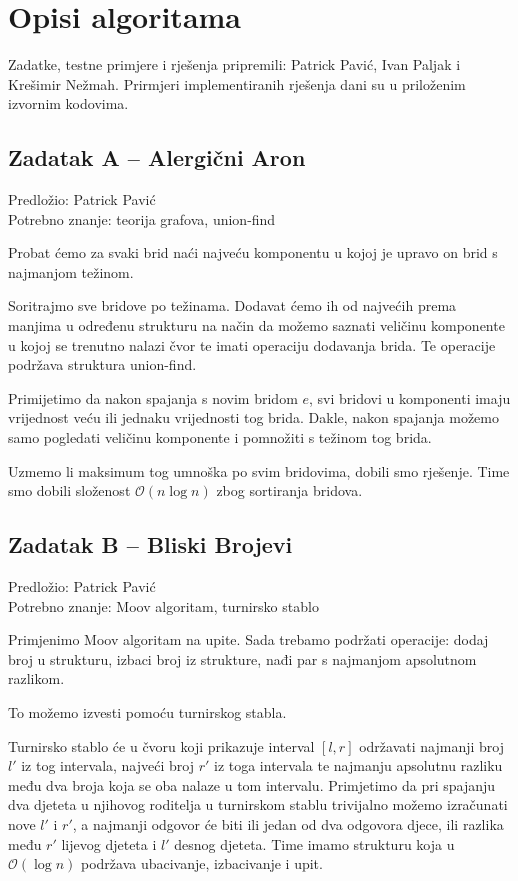 \documentclass[a4paper]{article}
\begin{document}
\section*{Opisi algoritama}
Zadatke, testne primjere i rješenja pripremili: Patrick Pavić, Ivan Paljak i
Krešimir Nežmah. Prirmjeri implementiranih rješenja dani su u priloženim izvornim
kodovima.

\subsection*{Zadatak A -- Alergični Aron}
\textsf{Predložio: Patrick Pavić}\\
\textsf{Potrebno znanje: teorija grafova, union-find}

Probat ćemo za svaki brid naći najveću komponentu u kojoj je upravo on brid s
najmanjom težinom.

Soritrajmo sve bridove po težinama. Dodavat ćemo ih od najvećih prema manjima u
određenu strukturu na način da možemo saznati veličinu komponente u kojoj se
trenutno nalazi čvor te imati operaciju dodavanja brida. Te operacije podržava
struktura union-find.

Primijetimo da nakon spajanja s novim bridom $e$, svi bridovi u komponenti imaju
vrijednost veću ili jednaku vrijednosti tog brida. Dakle, nakon spajanja možemo
samo pogledati veličinu komponente i pomnožiti s težinom tog brida.

Uzmemo li maksimum tog umnoška po svim bridovima, dobili smo rješenje. Time smo
dobili složenost $\mathcal{O}(n\log{}n)$ zbog sortiranja bridova.

\subsection*{Zadatak B -- Bliski Brojevi}
\textsf{Predložio: Patrick Pavić}\\
\textsf{Potrebno znanje: Moov algoritam, turnirsko stablo}

Primjenimo Moov algoritam na upite. Sada trebamo podržati operacije:
dodaj broj u strukturu, izbaci broj iz strukture, nađi par s najmanjom
apsolutnom razlikom.

To možemo izvesti pomoću turnirskog stabla.

Turnirsko stablo će u čvoru koji prikazuje interval $[l, r]$ održavati najmanji
broj $l'$ iz tog intervala, najveći broj $r'$ iz toga intervala te najmanju
apsolutnu razliku među dva broja koja se oba nalaze u tom intervalu. Primjetimo
da pri spajanju dva djeteta u njihovog roditelja u turnirskom stablu trivijalno
možemo izračunati nove $l'$ i $r'$, a najmanji odgovor će biti ili jedan od dva
odgovora djece, ili razlika među $r'$ lijevog djeteta i $l'$ desnog djeteta.
Time imamo strukturu koja u $\mathcal{O}(\log{}n)$ podržava ubacivanje,
izbacivanje i upit.
\end{document}
